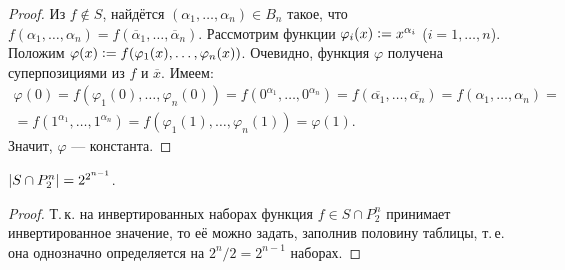\begin{proof}
    Из $f \notin S$, найдётся $(\alpha_1, \ldots, \alpha_n) \in B_n$ такое, что $f(\alpha_1, \ldots, \alpha_n) = f(\overline{\alpha}_1, \ldots, \overline{\alpha}_n)$. Рассмотрим функции $\varphi_i(x) \vcentcolon = x^{\alpha_i}$ ($i = 1, \ldots, n$). Положим $\varphi(x) \vcentcolon = f(\varphi_1(x), \ldots, \varphi_n(x))$. Очевидно, функция $\varphi$ получена суперпозициями из $f$ и $\overline{x}$. Имеем:
    \begin{multline*}
        \varphi(0) = f(\varphi_1(0), \ldots, \varphi_n(0)) = f(0^{\alpha_1}, \ldots, 0^{\alpha_n}) = f(\overline{\alpha_1}, \ldots, \overline{\alpha_n}) = f(\alpha_1, \ldots, \alpha_n) =\\ = f(1^{\alpha_1}, \ldots, 1^{\alpha_n}) = f(\varphi_1(1), \ldots, \varphi_n(1)) = \varphi(1).
    \end{multline*}
    Значит, $\varphi$ --- константа.
\end{proof}

\begin{proposal}
    $\left\lvert S \cap P_2^n\right\rvert = 2^{2^{n - 1}}$.
\end{proposal}

\begin{proof}
    Т.\,к. на инвертированных наборах функция $f \in S \cap P_2^n$ принимает инвертированное значение, то её можно задать, заполнив половину таблицы, т.\,е. она однозначно определяется на $2^n / 2 = 2^{n - 1}$ наборах.
\end{proof}

